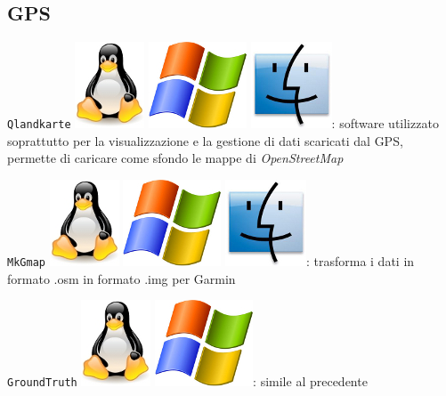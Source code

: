 \documentclass[a4paper,twoside,12pt,]{article}
\newcommand{\osm}{\emph{OpenStreetMap}\xspace}
\newcommand{\gps}{GPS\xspace}
\newcommand{\soft}[1]{\texttt{#1}}
\begin{document}
\subsection{GPS}

\soft{Qlandkarte} \includegraphics{./linux-logo.jpg} \includegraphics{./windows-logo.jpg} \includegraphics{./mac-logo.jpg}: software utilizzato soprattutto per la visualizzazione e la gestione di dati scaricati dal \gps, permette di caricare come sfondo le mappe di \osm

\soft{MkGmap} \includegraphics{./linux-logo.jpg} \includegraphics{./windows-logo.jpg} \includegraphics{./mac-logo.jpg}: trasforma i dati in formato .osm in formato .img per Garmin

\soft{GroundTruth} \includegraphics{./linux-logo.jpg} \includegraphics{./windows-logo.jpg}: simile al precedente
\end{document}
